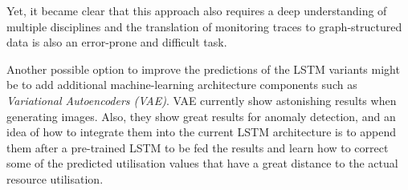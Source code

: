             Yet, it became clear that this approach also requires a deep understanding of multiple disciplines and the translation of monitoring traces to graph-structured data is also an error-prone and difficult task.

            Another possible option to improve the predictions of the LSTM variants might be to add additional machine-learning architecture components such as \emph{Variational Autoencoders (VAE)}. 
            VAE currently show astonishing results when generating images. 
            Also, they show great results for anomaly detection, and an idea of how to integrate them into the current LSTM architecture is to append them after a pre-trained LSTM to be fed the results and learn how to correct some of the predicted utilisation values that have a great distance to the actual resource utilisation.


